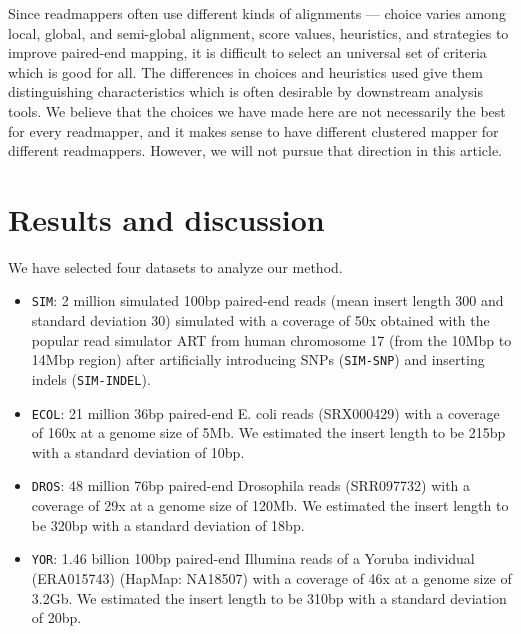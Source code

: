 \documentclass[a4paper]{article}
\begin{document}
Since readmappers often use different kinds of alignments --- choice varies
among local, global, and semi-global alignment,
score values, heuristics, and strategies to improve
paired-end mapping, it is difficult to
select an universal set of criteria which is good for all. The
differences in choices and heuristics used give them distinguishing
characteristics which is often desirable by downstream analysis tools.
We believe that the choices we have made here are not
necessarily the best for every readmapper,
and it makes sense to have different clustered mapper for different
readmappers. However, we will not pursue that direction in this article.



\section{Results and discussion}
We have selected four datasets to analyze our method.


\begin{itemize}
  \setlength{\itemsep}{1pt}
  \setlength{\parskip}{0pt}
  \setlength{\parsep}{0pt}

\item {\tt SIM}: 2 million simulated 100bp paired-end reads
	(mean insert length 300 and standard
	deviation 30)
	simulated with a coverage of 50x
	obtained with the popular read simulator ART \cite{Huang15022012}
	from human chromosome 17 (from the 10Mbp to 14Mbp region) after
	artificially introducing
	SNPs ({\tt SIM-SNP}) and inserting indels ({\tt SIM-INDEL}).

\item {\tt ECOL}: 21 million 36bp paired-end E. coli reads
  (SRX000429) with a coverage of 160x at a
  genome size of
  5Mb. We estimated the insert length to be 215bp with a standard
  deviation of 10bp.

\item {\tt DROS}: 48 million 76bp paired-end Drosophila reads
  (SRR097732) \cite{Langley01062011} with a coverage of 29x at a
  genome size of
  120Mb. We estimated the insert length to be 320bp with a standard
  deviation of 18bp.

\item {\tt YOR}: 1.46 billion 100bp paired-end Illumina reads of a
  Yoruba individual (ERA015743) (HapMap: NA18507) with a coverage of 46x at a
  genome size of 3.2Gb. We estimated the insert length to be 310bp
  with a standard deviation of 20bp.
\end{itemize}
\end{document}

